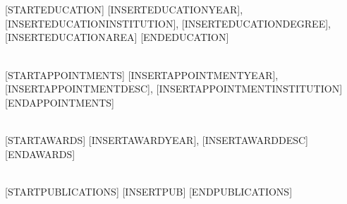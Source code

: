 
\NameBoldface{\color{\NameColor}{\NameSize [INSERTNAME] ([INSERTROLE]):}}\\
[INSERTAFFILIATION]

\SectionSpacing
{}\\
[STARTEDUCATION]
[INSERTEDUCATIONYEAR], [INSERTEDUCATIONINSTITUTION], [INSERTEDUCATIONDEGREE], [INSERTEDUCATIONAREA]
[ENDEDUCATION]

\SectionSpacing
{}\\
[STARTAPPOINTMENTS]
[INSERTAPPOINTMENTYEAR], [INSERTAPPOINTMENTDESC], [INSERTAPPOINTMENTINSTITUTION]
[ENDAPPOINTMENTS]

\SectionSpacing
{}\\
[STARTAWARDS]
[INSERTAWARDYEAR], [INSERTAWARDDESC]
[ENDAWARDS]

\SectionSpacing
{}\\

[STARTPUBLICATIONS]
{\PublicationBullet}[INSERTPUB]
[ENDPUBLICATIONS]

